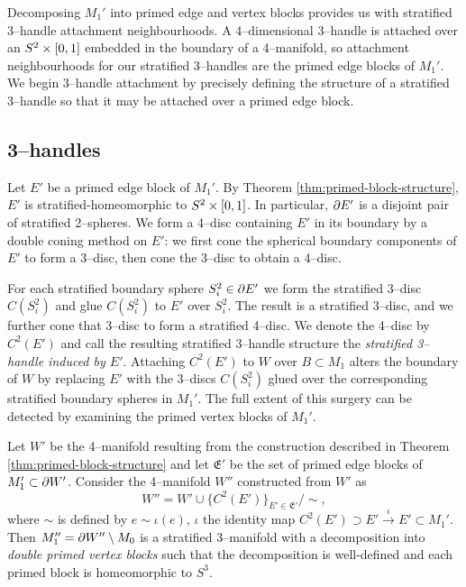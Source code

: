 Decomposing $M_1'$ into primed edge and vertex blocks provides us with stratified 3--handle attachment neighbourhoods.
A 4--dimensional 3--handle is attached over an $S^2\times[0,1]$ embedded in the boundary of a 4--manifold, so attachment neighbourhoods for our stratified 3--handles are the primed edge blocks of $M_1'$.
We begin 3--handle attachment by precisely defining the structure of a stratified 3--handle so that it may be attached over a primed edge block.

\subsection{3--handles}

Let $E'$ be a primed edge block of $M_1'$.
By Theorem \ref{thm:primed-block-structure}, $E'$ is stratified-homeomorphic to $S^2\times[0,1]$.
In particular, $\partial E'$ is a disjoint pair of stratified 2--spheres.
We form a 4--disc containing $E'$ in its boundary by a double coning method on $E'$: we first cone the spherical boundary components of $E'$ to form a 3--disc, then cone the 3--disc to obtain a 4--disc.


For each stratified boundary sphere $S_i^2\in\partial E'$ we form the stratified 3--disc $C(S_i^2)$ and glue $C(S_i^2)$ to $E'$ over $S_i^2$.
The result is a stratified 3--disc, and we further cone that 3--disc to form a stratified 4--disc.
We denote the 4--disc by $C^2(E')$ and call the resulting stratified 3--handle structure the \emph{stratified 3--handle induced by $E'$}.
Attaching $C^2(E')$ to $W$ over $B\subset M_1$ alters the boundary of $W$ by replacing $E'$ with the 3--discs $C(S_i^2)$ glued over the corresponding stratified boundary spheres in $M_1'$.
The full extent of this surgery can be detected by examining the primed vertex blocks of $M_1'$.

\begin{cor}
	\label{thm:primed-primed-block-structure}
	Let $W'$ be the 4--manifold resulting from the construction described in Theorem \ref{thm:primed-block-structure} and let $\mathfrak{E}'$ be the set of primed edge blocks of $M_1'\subset\partial W'$.
	Consider the 4--manifold $W''$ constructed from $W'$ as
	\[
	W'' = W'\cup\{C^2(E')\}_{E'\in \mathfrak{E}'} / \sim,
	\]
	where $\sim$ is defined by $e\sim \iota(e)$, $\iota$ the identity map $C^2(E')\supset E'\overset{\iota}{\to} E'\subset M_1'$.
	Then $M_1''=\partial W''\setminus M_0$ is a stratified 3--manifold with a decomposition into \emph{double primed vertex blocks} such that the decomposition is well-defined and each primed block is homeomorphic to $S^3$.
\end{cor}

